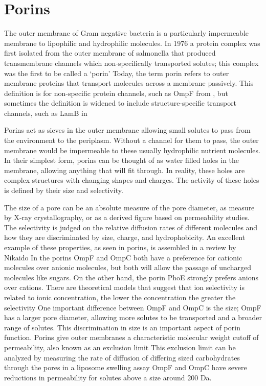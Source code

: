  \section{Porins} \label{sec:intro-porins}   
 
The outer membrane of Gram negative bacteria is a particularly impermeable membrane to lipophilic and hydrophilic molecules. In 1976 a protein complex was first isolated from the outer membrane of \ac{salmonella} that produced transmembrane channels which non-specifically transported solutes; this complex was the first to be called a `porin' Today, the term porin refers to outer membrane proteins that transport molecules across a membrane passively. This definition is for non-specific protein channels, such as OmpF from \ecoli{}, but sometimes the definition is widened to include structure-specific transport channels, such as LamB in \ecoli{} 

Porins act as sieves in the outer membrane allowing small solutes to pass from the environment to the periplasm. Without a channel for them to pass, the outer membrane would be impermeable to these usually hydrophilic nutrient molecules. In their simplest form, porins can be thought of as water filled holes in the membrane, allowing anything that will fit through. In reality, these holes are complex structures with changing shapes and charges. The activity of these holes is defined by their size and selectivity.

The size of a pore can be an absolute measure of the pore diameter, as measure
by X-ray crystallography, or as a derived figure based on permeability studies.
The selectivity is judged on the relative diffusion rates of different molecules
and how they are discriminated by size, charge, and hydrophobicity. An excellent
example of these properties, as seen in \ecoli{} porins, is assembled in a
review by Nikaido In \ecoli{} the
porins OmpF and OmpC both have a preference for cationic molecules over anionic
molecules, but both will allow the passage of uncharged molecules like sugars.
On the other hand, the \ecoli{} porin PhoE strongly prefers anions over cations.
There are theoretical models that suggest that ion selectivity is related to
ionic concentration, the lower the concentration the greater the
selectivity One important difference between OmpF and OmpC
is the size; OmpF has a larger pore diameter, allowing more solutes to be
transported and a broader range of solutes. This discrimination in size is an
important aspect of porin function. Porins give outer membranes a characteristic
molecular weight cutoff of permeability, also known as an exclusion
limit This exclusion limit can be analyzed by
measuring the rate of diffusion of differing sized carbohydrates through the
pores in a liposome swelling assay OmpF and OmpC
have severe reductions in permeability for solutes above a size around 200 Da.
 
